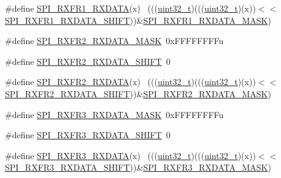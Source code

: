 \begin{DoxyCompactItemize}
\#define \hyperlink{group___s_p_i___register___masks_ga5b60ccd0f9298455decd8c152935d598}{S\+P\+I\+\_\+\+R\+X\+F\+R1\+\_\+\+R\+X\+D\+A\+TA}(x)                                        ~(((\hyperlink{_p_e___types_8h_a33594304e786b158f3fb30289278f5af}{uint32\+\_\+t})(((\hyperlink{_p_e___types_8h_a33594304e786b158f3fb30289278f5af}{uint32\+\_\+t})(x))$<$$<$\hyperlink{group___s_p_i___register___masks_gab6747e932cee7cbdab3b46213f8d793b}{S\+P\+I\+\_\+\+R\+X\+F\+R1\+\_\+\+R\+X\+D\+A\+T\+A\+\_\+\+S\+H\+I\+FT}))\&\hyperlink{group___s_p_i___register___masks_gae5778ef350adb171937498b1b49ffdb0}{S\+P\+I\+\_\+\+R\+X\+F\+R1\+\_\+\+R\+X\+D\+A\+T\+A\+\_\+\+M\+A\+SK})
\item 
\#define \hyperlink{group___s_p_i___register___masks_ga659737d6e82c6f3ace0e1d568157426f}{S\+P\+I\+\_\+\+R\+X\+F\+R2\+\_\+\+R\+X\+D\+A\+T\+A\+\_\+\+M\+A\+SK}~0x\+F\+F\+F\+F\+F\+F\+F\+Fu
\item 
\#define \hyperlink{group___s_p_i___register___masks_gac8d903abae42a6b97dcbdc5bf31b1276}{S\+P\+I\+\_\+\+R\+X\+F\+R2\+\_\+\+R\+X\+D\+A\+T\+A\+\_\+\+S\+H\+I\+FT}~0
\item 
\#define \hyperlink{group___s_p_i___register___masks_gabc8371b1dd143af63fe02d90a5955a8f}{S\+P\+I\+\_\+\+R\+X\+F\+R2\+\_\+\+R\+X\+D\+A\+TA}(x)                                        ~(((\hyperlink{_p_e___types_8h_a33594304e786b158f3fb30289278f5af}{uint32\+\_\+t})(((\hyperlink{_p_e___types_8h_a33594304e786b158f3fb30289278f5af}{uint32\+\_\+t})(x))$<$$<$\hyperlink{group___s_p_i___register___masks_gac8d903abae42a6b97dcbdc5bf31b1276}{S\+P\+I\+\_\+\+R\+X\+F\+R2\+\_\+\+R\+X\+D\+A\+T\+A\+\_\+\+S\+H\+I\+FT}))\&\hyperlink{group___s_p_i___register___masks_ga659737d6e82c6f3ace0e1d568157426f}{S\+P\+I\+\_\+\+R\+X\+F\+R2\+\_\+\+R\+X\+D\+A\+T\+A\+\_\+\+M\+A\+SK})
\item 
\#define \hyperlink{group___s_p_i___register___masks_ga06579b6d579b820152dd81435d71c09e}{S\+P\+I\+\_\+\+R\+X\+F\+R3\+\_\+\+R\+X\+D\+A\+T\+A\+\_\+\+M\+A\+SK}~0x\+F\+F\+F\+F\+F\+F\+F\+Fu
\item 
\#define \hyperlink{group___s_p_i___register___masks_gaae4c2a3c38669f7a03fbcaabd29de0c7}{S\+P\+I\+\_\+\+R\+X\+F\+R3\+\_\+\+R\+X\+D\+A\+T\+A\+\_\+\+S\+H\+I\+FT}~0
\item 
\#define \hyperlink{group___s_p_i___register___masks_ga8c7e9deb3b65a9c53481ba16d8e6549d}{S\+P\+I\+\_\+\+R\+X\+F\+R3\+\_\+\+R\+X\+D\+A\+TA}(x)                                        ~(((\hyperlink{_p_e___types_8h_a33594304e786b158f3fb30289278f5af}{uint32\+\_\+t})(((\hyperlink{_p_e___types_8h_a33594304e786b158f3fb30289278f5af}{uint32\+\_\+t})(x))$<$$<$\hyperlink{group___s_p_i___register___masks_gaae4c2a3c38669f7a03fbcaabd29de0c7}{S\+P\+I\+\_\+\+R\+X\+F\+R3\+\_\+\+R\+X\+D\+A\+T\+A\+\_\+\+S\+H\+I\+FT}))\&\hyperlink{group___s_p_i___register___masks_ga06579b6d579b820152dd81435d71c09e}{S\+P\+I\+\_\+\+R\+X\+F\+R3\+\_\+\+R\+X\+D\+A\+T\+A\+\_\+\+M\+A\+SK})
$$
\end{DoxyCompactItemize}
